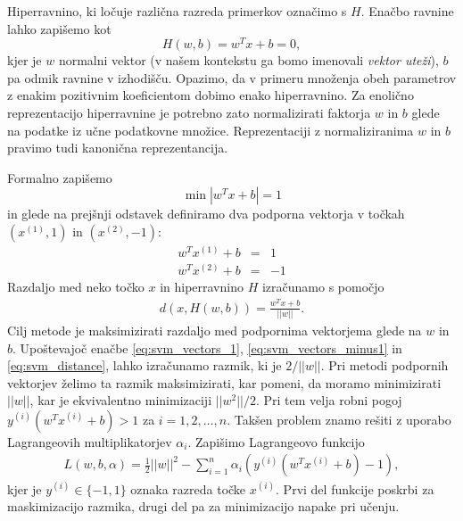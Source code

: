 \documentclass[11pt,a4paper,openany]{book}
\begin{document}
Hiperravnino, ki ločuje različna razreda primerkov označimo s $H$. Enačbo ravnine lahko zapišemo kot
\begin{equation}
  H(w, b) = w^T x + b = 0,
\end{equation}
kjer je $w$ normalni vektor (v našem kontekstu ga bomo imenovali \textit{vektor uteži}), $b$ pa odmik ravnine v izhodišču. Opazimo, da v primeru množenja obeh parametrov z enakim pozitivnim koeficientom dobimo enako hiperravnino. Za enolično reprezentacijo hiperravnine je potrebno zato normalizirati faktorja $w$ in $b$ glede na podatke iz učne podatkovne množice. Reprezentaciji z normaliziranima $w$ in $b$ pravimo tudi kanonična reprezentancija.

Formalno zapišemo
\begin{equation}
	\min |w^T x + b| = 1
\end{equation}
in glede na prejšnji odstavek definiramo dva podporna vektorja v točkah $(x^{(1)}, 1)$ in $(x^{(2)}, -1)$:
\begin{eqnarray}
	w^Tx^{(1)} + b &=& 1 
	\label{eq:svm_vectors_1} \\
	w^Tx^{(2)} + b &=& -1
	\label{eq:svm_vectors_minus1}
\end{eqnarray}
Razdaljo med neko točko $x$ in hiperravnino $H$ izračunamo s pomočjo
\begin{eqnarray}
	d(x, H(w, b)) = \frac{w^Tx + b}{||w||}.
	\label{eq:svm_distance}
\end{eqnarray}
Cilj metode je maksimizirati razdaljo med podpornima vektorjema glede na $w$ in $b$. Upoštevajoč enačbe \ref{eq:svm_vectors_1}, \ref{eq:svm_vectors_minus1} in \ref{eq:svm_distance}, lahko izračunamo razmik, ki je $2 / ||w||$. Pri metodi podpornih vektorjev želimo ta razmik maksimizirati, kar pomeni, da moramo minimizirati $||w||$, kar je ekvivalentno minimizaciji $||w^2||/2$. Pri tem velja robni pogoj $y^{(i)}(w^Tx^{(i)} + b) > 1$ za $i = 1, 2, \ldots, n$. Takšen problem znamo rešiti z uporabo Lagrangeovih multiplikatorjev $\alpha_i$. Zapišimo Lagrangeovo funkcijo
\begin{eqnarray}
	L(w, b, \alpha) = \frac{1}{2}||w||^2 - \sum^n_{i=1} \alpha_i(y^{(i)}(w^Tx^{(i)} + b) - 1),
\end{eqnarray}
kjer je $y^{(i)} \in \{-1, 1\}$ oznaka razreda točke $x^{(i)}$. Prvi del funkcije poskrbi za maskimizacijo razmika, drugi del pa za minimizacijo napake pri učenju.
\end{document}
